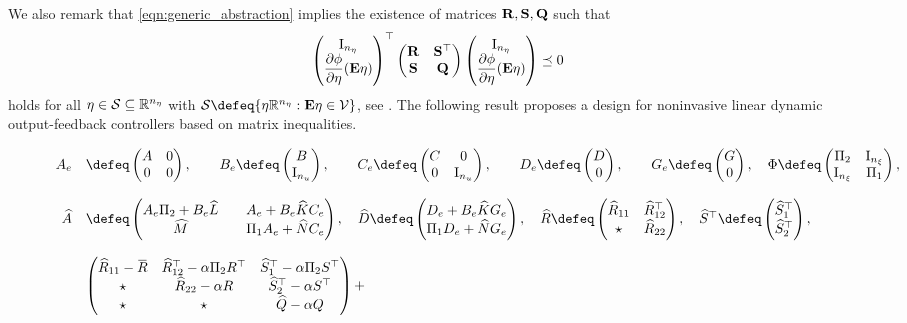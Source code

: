 \documentclass{ifacconf}
\begin{document}
We also remark that \eqref{eqn:generic_abstraction} implies the existence of matrices ${\bf{R}},{\bf{S}},{\bf{Q}}$ such that
\begin{equation}\label{eqn:generic_abstraction_ctrl}
    \left(\begin{matrix}\operatorname{I}_{n_\eta}\\\dfrac{\partial \phi}{\partial \eta}({\bf{E}}\eta)\end{matrix}\right)^\top\left(\begin{matrix}{\bf{R}}&{\bf{S}}^\top\\{\bf{S}}&{\bf{Q}}\end{matrix}\right)\left(\begin{matrix}\operatorname{I}_{n_\eta}\\\dfrac{\partial \phi}{\partial \eta}({\bf{E}}\eta)\end{matrix}\right)\preceq 0
\end{equation}
holds for all $\eta\in{\mathcal{S}}\subseteq {\mathbb{R}}^{n_\eta}$ with $\cS\defeq\{\eta\RR^{n_\eta}: \bE\eta\in\cV\}$, see \citep[Section 2.5]{zoboli2024dynamic}. 
The following result proposes a design for noninvasive linear dynamic output-feedback controllers based on matrix inequalities.
\begin{figure*}
    \begin{equation}\label{eqn:2_contraction_BMI}
    \begin{array}{rl}
      A_e&\defeq \pmx{A&0\\0&0},\qquad  B_e \defeq \pmx{B\\\Id_{n_u}},\qquad C_e \defeq \pmx{C&0\\0&\Id_{n_u}},\qquad 
    D_e \defeq  \pmx{D\\0}, \qquad G_e \defeq  \pmx{G\\0}, \quad 
        \Phi \defeq \pmx{\Pi_2 & \Id_{n_\xi}\\ \Id_{n_\xi} & \Pi_1},
     \\&\\
        \widehat A &\defeq\pmx{A_e\Pi_2+B_e \widehat L && A_e + B_e  \widehat K C_e \\ \widehat M && \Pi_1 A_e+ \widehat N  C_e }, \quad  
        \widehat D \defeq \pmx{D_e +B_e \widehat K G_e\\ \Pi_1 D_e  + \widehat N G_e}, 
        \quad  \widehat R \defeq \pmx{ \widehat R_{11} &  \widehat R_{12}^\top\\
        \star & \widehat R_{22}}, \quad \widehat S^\top \defeq \pmx{\widehat S_1^\top \\ \widehat S_2^\top},
        \\&\\
        &
        \pmx{\widehat R_{11} - \overbar R& \widehat R_{12}^\top - \alpha \Pi_2 R^\top & \widehat S_{1}^\top-\alpha \Pi_2 S^\top\\
         \star & \widehat R_{22}-\alpha R & \widehat S_{2}^\top -\alpha S^\top \\
         \star&\star& \widehat Q-\alpha Q} +

\end{array}
\end{equation}
\end{figure*}
\end{document}
